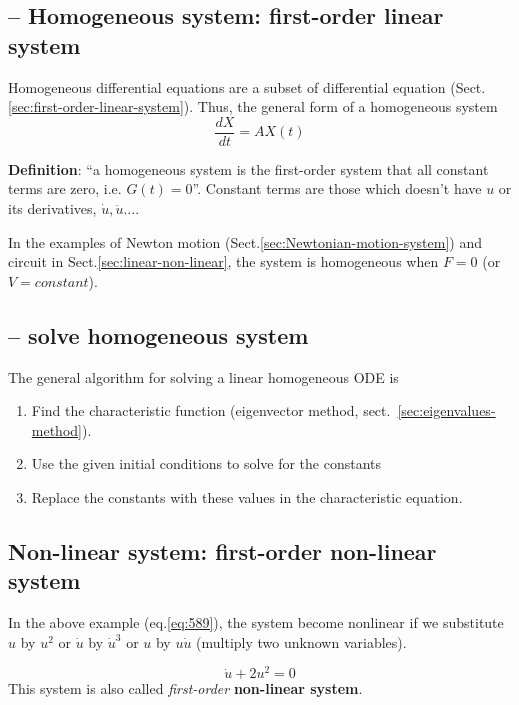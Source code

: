 \subsection{-- Homogeneous system: first-order linear system}
\label{sec:homogeneous-system}

Homogeneous differential equations are a subset of differential equation
(Sect.\ref{sec:first-order-linear-system}).
Thus, the general form of a homogeneous system
\begin{equation}
  \label{eq:653}
  \frac{dX}{dt} = AX(t)
\end{equation}

{\bf Definition}: ``a homogeneous system is the first-order system that all
constant terms are zero, i.e. $G(t)=0$''. Constant terms are those which doesn't
have $u$ or its derivatives, $\dot{u}, \ddot{u}...$. 

In the examples of Newton motion (Sect.\ref{sec:Newtonian-motion-system}) and
circuit in Sect.\ref{sec:linear-non-linear}, the system is homogeneous when $F=0$ (or
$V=constant$).

\subsection{-- solve homogeneous system}

The general algorithm for solving a linear homogeneous ODE is

\begin{enumerate}

\item Find the characteristic function (eigenvector method,
  sect.~\ref{sec:eigenvalues-method}). 

\item Use the given initial conditions to solve for the constants

\item Replace the constants with these values in the characteristic
  equation.
\end{enumerate}


\subsection{Non-linear system: first-order non-linear system}

In the above example (eq.\ref{eq:589}), the system become nonlinear if we
substitute $u$ by $u^2$ or $\dot{u}$ by $\dot{u}^3$ or $u$ by $u\dot{u}$
(multiply two unknown variables).

\begin{equation}
  \label{eq:590}
  \dot{u} + 2u^2 = 0
\end{equation}
This system is also called {\it first-order} {\bf non-linear system}.


